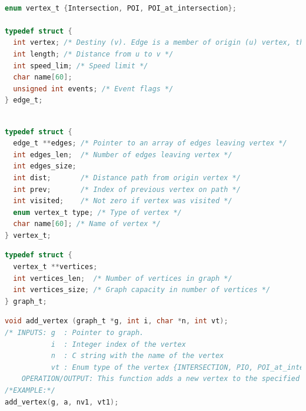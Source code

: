 \documentclass[10pt]{article}
\begin{document}
\begin{lstlisting}[language=C, caption= Edge structure]

enum vertex_t {Intersection, POI, POI_at_intersection};

typedef struct {
  int vertex; /* Destiny (v). Edge is a member of origin (u) vertex, thus no need to specify origin. */
  int length; /* Distance from u to v */
  int speed_lim; /* Speed limit */
  char name[60];
  unsigned int events; /* Event flags */
} edge_t;

\end{lstlisting}


\begin{lstlisting}[language=C, caption= Vertex structure]

typedef struct {
  edge_t **edges; /* Pointer to an array of edges leaving vertex */
  int edges_len;  /* Number of edges leaving vertex */
  int edges_size;
  int dist;       /* Distance path from origin vertex */
  int prev;       /* Index of previous vertex on path */
  int visited;    /* Not zero if vertex was visited */
  enum vertex_t type; /* Type of vertex */
  char name[60]; /* Name of vertex */
} vertex_t;
\end{lstlisting}

\begin{lstlisting}[language=C, caption= Graph structure]
typedef struct {
  vertex_t **vertices;
  int vertices_len;  /* Number of vertices in graph */
  int vertices_size; /* Graph capacity in number of vertices */
} graph_t;

\end{lstlisting}


\begin{lstlisting}[language=C, caption= \textbf{API-1 add\_vertex}]
void add_vertex (graph_t *g, int i, char *n, int vt);
/* INPUTS: g  : Pointer to graph.
           i  : Integer index of the vertex
           n  : C string with the name of the vertex 
           vt : Enum type of the vertex {INTERSECTION, PIO, POI_at_intersection}
    OPERATION/OUTPUT: This function adds a new vertex to the specified graph. It is intended to be used by add_edge, but it can be called independently. */
/*EXAMPLE:*/  
add_vertex(g, a, nv1, vt1);
\end{lstlisting}
\end{document}
